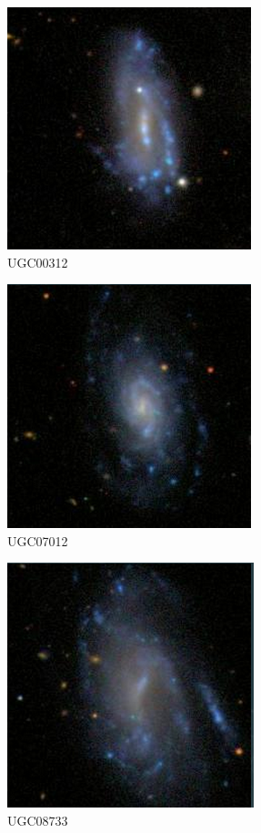 \documentclass[9pt]{revtex4-1}
\begin{document}
\twocolumngrid
\begin{figure}
\includegraphics[scale=0.3]{UGC00312.png}
\caption{UGC00312}
\end{figure}
\begin{figure}
\includegraphics[scale=0.3]{UGC07012.png}
\caption{UGC07012}
\end{figure}
\begin{figure}
\includegraphics[scale=0.3]{UGC08733.png}
\caption{UGC08733}
\end{figure}
\end{document}

